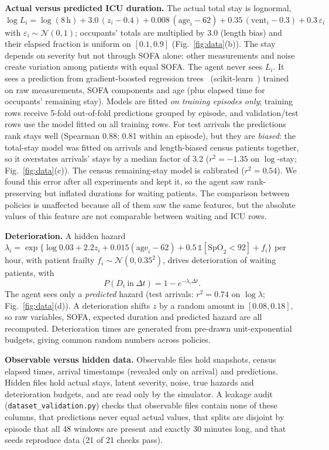 \documentclass{rlreport}
\begin{document}
\textbf{Actual versus predicted ICU duration.} The actual total stay is lognormal,
$\log L_i=\log(8\,\mathrm{h})+3.0\,(z_i-0.4)+0.008\,(\mathrm{age}_i-62)+0.35\,(\mathrm{vent}_i-0.3)+0.3\,\varepsilon_i$ with $\varepsilon_i\sim\mathcal N(0,1)$; occupants' totals are multiplied by 3.0 (length bias) and their elapsed fraction is uniform on $[0.1,0.9]$ (Fig.~\ref{fig:data}(b)). The stay depends on severity but not through SOFA alone: other measurements and noise create variation among patients with equal SOFA. The agent never sees $L_i$. It sees a prediction from gradient-boosted regression trees~\cite{friedman2001gbm} (scikit-learn~\cite{pedregosa2011sklearn}) trained on raw measurements, SOFA components and age (plus elapsed time for occupants' remaining stay). Models are fitted \emph{on training episodes only}; training rows receive 5-fold out-of-fold predictions grouped by episode, and validation/test rows use the model fitted on all training rows. For test arrivals the predictions rank stays well (Spearman 0.88; 0.81 within an episode), but they are \emph{biased}: the total-stay model was fitted on arrivals and length-biased census patients together, so it overstates arrivals' stays by a median factor of 3.2 ($r^2=-1.35$ on $\log$-stay; Fig.~\ref{fig:data}(c)). The census remaining-stay model is calibrated ($r^2=0.54$). We found this error after all experiments and kept it, so the agent saw rank-preserving but inflated durations for waiting patients. The comparison between policies is unaffected because all of them saw the same features, but the absolute values of this feature are not comparable between waiting and ICU rows.

\textbf{Deterioration.} A hidden hazard $\lambda_i=\exp\{\log 0.03+2.2z_i+0.015(\mathrm{age}_i-62)+0.5\,\mathbb 1[\mathrm{SpO}_2<92]+f_i\}$ per hour, with patient frailty $f_i\sim\mathcal N(0,0.35^2)$, drives deterioration of waiting patients, with
\begin{equation}
  P(D_i\ \text{in}\ \Delta t)=1-e^{-\lambda_i\Delta t}.
  \label{eq:hazard}
\end{equation}
The agent sees only a \emph{predicted} hazard (test arrivals: $r^2=0.74$ on $\log\lambda$; Fig.~\ref{fig:data}(d)). A deterioration shifts $z$ by a random amount in $[0.08,0.18]$, so raw variables, SOFA, expected duration and predicted hazard are all recomputed. Deterioration times are generated from pre-drawn unit-exponential budgets, giving common random numbers across policies.

\textbf{Observable versus hidden data.} Observable files hold snapshots, census elapsed times, arrival timestamps (revealed only on arrival) and predictions. Hidden files hold actual stays, latent severity, noise, true hazards and deterioration budgets, and are read only by the simulator. A leakage audit (\texttt{dataset\_validation.py}) checks that observable files contain none of these columns, that predictions never equal actual values, that splits are disjoint by episode that all 48 windows are present and exactly 30 minutes long, and that seeds reproduce data (21 of 21 checks pass).
\end{document}
